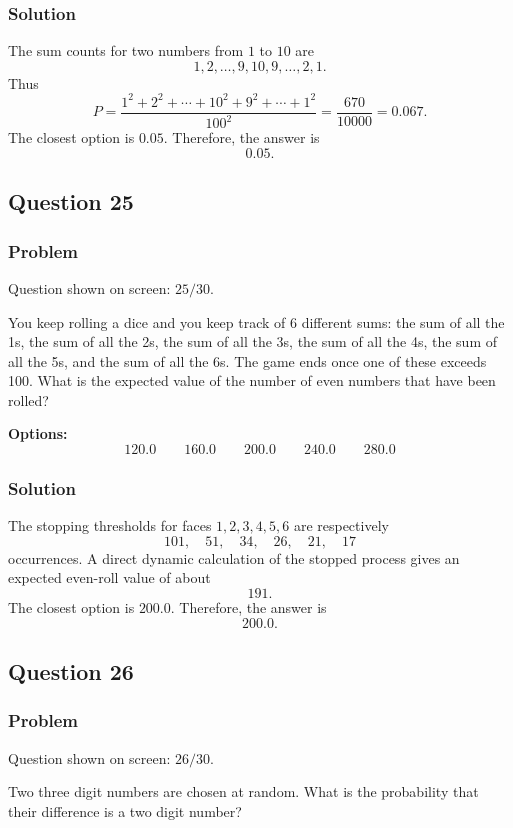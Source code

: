\documentclass[12pt]{article}
\begin{document}
\subsubsection{Solution}
The sum counts for two numbers from \(1\) to \(10\) are
\[
1,2,\ldots,9,10,9,\ldots,2,1.
\]
Thus
\[
P=\frac{1^2+2^2+\cdots+10^2+9^2+\cdots+1^2}{100^2}
=\frac{670}{10000}=0.067.
\]
The closest option is \(0.05\). Therefore, the answer is
\[
\boxed{0.05}.
\]

\subsection{Question 25}
\subsubsection{Problem}
Question shown on screen: \(25/30\).

You keep rolling a dice and you keep track of 6 different sums: the sum of all the 1s, the sum of all the 2s, the sum of all the 3s, the sum of all the 4s, the sum of all the 5s, and the sum of all the 6s. The game ends once one of these exceeds 100. What is the expected value of the number of even numbers that have been rolled?

\noindent\textbf{Options:}
\[
\boxed{120.0}
\qquad
\boxed{160.0}
\qquad
\boxed{200.0}
\qquad
\boxed{240.0}
\qquad
\boxed{280.0}
\]

\subsubsection{Solution}
The stopping thresholds for faces \(1,2,3,4,5,6\) are respectively
\[
101,\quad 51,\quad 34,\quad 26,\quad 21,\quad 17
\]
occurrences. A direct dynamic calculation of the stopped process gives an expected even-roll value of about
\[
191.
\]
The closest option is \(200.0\). Therefore, the answer is
\[
\boxed{200.0}.
\]

\subsection{Question 26}
\subsubsection{Problem}
Question shown on screen: \(26/30\).

Two three digit numbers are chosen at random. What is the probability that their difference is a two digit number?
\end{document}

